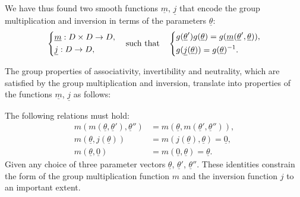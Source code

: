 We have thus found two smooth functions \(\underline{m}\), \(\underline{j}\) that encode the group multiplication and inversion in terms of the parameters \(\underline{\theta}\):
\begin{equation}
    \begin{dcases}
        \underline{m} : D \times D \to D, \\
        \underline{j} : D \to D,
    \end{dcases} \quad \text{such that} \quad \begin{dcases}
        g(\underline{\theta}') g(\underline{\theta}) = g(\underline{m}(\underline{\theta}', \underline{\theta})), \\
        g(\underline{j}(\underline{\theta})) = g(\underline{\theta})^{-1}.
    \end{dcases}
    \label{eq:lie_multiplication_inversion_functions_definitions}
\end{equation}

The group properties of associativity, invertibility and neutrality, which are satisfied by the group multiplication and inversion, translate into properties of the functions \(\underline{m}\), \(\underline{j}\) as follows:
\begin{proposition}
    The following relations must hold:
    \begin{equation}
        \begin{aligned}
            m(m(\underline{\theta}, \underline{\theta}'), \underline{\theta}'') & = m(\underline{\theta}, m(\underline{\theta}', \underline{\theta}'')), \\
            m(\underline{\theta}, j(\underline{\theta}))                        & = m(j(\underline{\theta}), \underline{\theta}) = \underline{0},        \\
            m(\underline{\theta}, \underline{0})                                & = m(\underline{0}, \underline{\theta}) = \underline{\theta}.
        \end{aligned}
        \label{eq:lie_multiplication_inversion_functions_properties}
    \end{equation}
    Given any choice of three parameter vectors \(\underline{\theta}\), \(\underline{\theta}'\), \(\underline{\theta}''\). These identities constrain the form of the group multiplication function \(m\) and the inversion function \(j\) to an important extent.
\end{proposition}

